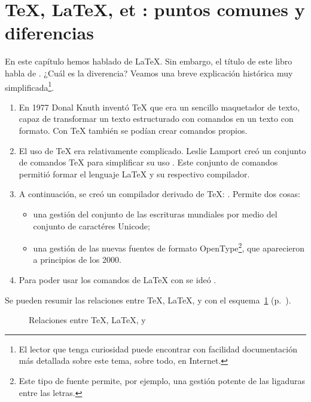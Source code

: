 \section[TeX, LaTeX, XeTeX, XeLaTeX: puntos comunes y diferencias]{\TeX{}, \LaTeX{}, \XeTeX{} et \XeLaTeX{}: puntos comunes y diferencias}\label{TeXLaTeX}

En este capítulo hemos hablado de \LaTeX{}. Sin embargo, el título de este libro habla de \XeLaTeX{}. ¿Cuál es la diverencia? Veamos una breve explicación histórica muy simplificada\footnote{El lector que tenga curiosidad puede encontrar con facilidad documentación más detallada sobre este tema, sobre todo, en Internet.}.

\begin{enumerate}
\item En 1977 Donal Knuth inventó  \TeX{} que era un sencillo maquetador de texto, capaz de transformar un texto estructurado con comandos en un texto con formato. Con \TeX{} también se podían crear comandos propios.
\item El uso de \TeX{} era relativamente complicado. Leslie Lamport creó un conjunto de comandos \TeX{} para simplificar su uso . Este conjunto de comandos permitió formar el lenguaje \LaTeX{} y su respectivo compilador.
\item A continuación, se creó un compilador derivado de \TeX{}: \XeTeX{}. Permite dos cosas:
\begin{itemize}
	\item una gestión del conjunto de las escrituras mundiales por medio del conjunto de caractéres Unicode;
	\item una gestión de las nuevas fuentes de formato OpenType\footnote{Este tipo de fuente permite, por ejemplo, una gestión potente de las ligaduras entre las letras.}, que aparecieron a principios de los 2000.

\end{itemize} 
\item Para poder usar los comandos de \LaTeX{} con \XeTeX{} se ideó \XeLaTeX{}.
\end{enumerate}

Se pueden resumir las relaciones entre \TeX{}, \LaTeX{}, \XeTeX{} y \XeLaTeX{} con el esquema~\ref{sch:tex} (p.~\pageref{sch:tex}).

\begin{figure}[ht]
\centering

\caption{Relaciones entre \TeX{}, \LaTeX{}, \XeTeX{} y \XeLaTeX{}}\label{sch:tex}
\end{figure} 

